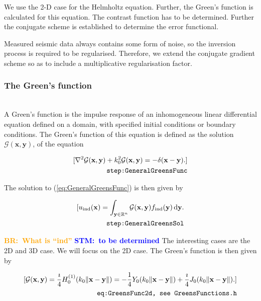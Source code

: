 \documentclass[10pt,a4paper]{article}
\newcommand{\df}[1]{\, \ensuremath{\mbox{d}#1}}
\newcommand{\commentstm}[1]{\textcolor{blue}{\textbf{STM:\ #1}}}
\newcommand{\oldstmtwo}[1]{\xout{#1}}
\newcommand{\commentbr}[1]{\textcolor{orange}{\textbf{BR:\ #1}}}
\begin{document}
We use the 2-D case for the Helmholtz equation. Further, the Green's
function is calculated for this equation. The contrast function has to
be determined. Further the conjugate scheme is established to
determine the error functional.

Measured seismic data always contains some form of noise, so the
inversion process is required to be regularised. Therefore, we extend
the conjugate gradient scheme so as to include a multiplicative regularisation factor.

\subsubsection{The Green's function}
\oldstmtwo{\textbf{2.1. The Green's function}}\\
A Green's function is the impulse response of an inhomogeneous linear
differential equation defined on a domain, with specified initial
conditions or boundary conditions.
The Green's function of this equation is defined as the solution
$\mathcal{G}(\mathbf{x}, \mathbf{y})$, of the equation

\begin{align}
\label{eq:GeneralGreensFunc}
[ \nabla^2 \mathcal{G}(\mathbf{x}, \mathbf{y}) + k_0^2
\mathcal{G}(\mathbf{x}, \mathbf{y}) = -\delta(\mathbf{x} -
\mathbf{y}). ]\\
\tag*{\texttt{step:GeneralGreensFunc}}
\end{align}

The solution to (\ref{eq:GeneralGreensFunc}) is then given by

\begin{align} \label{eq:GeneralGreensSol}
[ u_\text{ind}(\mathbf{x}) =
\int_{\mathbf{y} \in \mathbb{R}^n} \mathcal{G}(\mathbf{x}, \mathbf{y})
f_\text{ind}(\mathbf{y}) \df{\mathbf{y}}.\\
\tag*{\texttt{step:GeneralGreensSol}}
\end{align}

\commentbr{What is ``ind''}
\commentstm{to be determined}
The interesting cases are the 2D and 3D case. We will focus on the 2D case. The Green's function is then
given by

\begin{align} \label{eq:GreensFunc2d}[ \mathcal{G}(\mathbf{x}, \mathbf{y}) =
\frac{\imath}{4} H_0^{(1)}(k_0 \|\mathbf{x} - \mathbf{y}\|) =
-\frac{1}{4} Y_0(k_0 \|\mathbf{x} - \mathbf{y}\|) + \frac{\imath}{4}
J_0(k_0 \|\mathbf{x} - \mathbf{y}\|).  ]\\
\tag*{\texttt{eq:GreensFunc2d, see GreensFunctions.h}}
\end{align}
\end{document}

